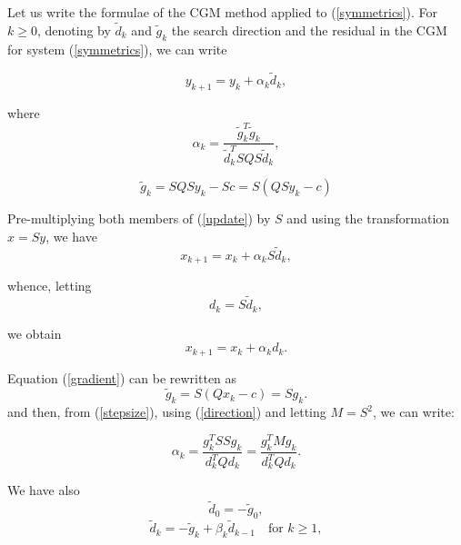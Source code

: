 \documentclass{ExerciseSheet}
\newif\ifsolutions
\begin{document}
\ifsolutions
\vskip 0.3cm
\begin{solution}
    Let us write the formulae of the CGM method applied to (\ref{symmetrics}). For $ k \geq 0 $, denoting by $\tilde{d}_k $ and $ \tilde{g}_k $ the search direction and the residual in the CGM for system (\ref{symmetrics}), we can write

\begin{equation} \label{update}
    y_{k+1} = y_k + \alpha_k \tilde{d}_k,
\end{equation}

where
\begin{equation}\label{stepsize}
    \alpha_k = \frac{\tilde{g}_k^T \tilde{g}_k}{\tilde{d}_k^T S Q S \tilde{d}_k},
\end{equation}

\begin{equation} \label{gradient}
    \tilde{g}_k = S Q S y_k - S c = S(Q S y_k - c) 
\end{equation}

Pre-multiplying both members of (\ref{update}) by $S$ and using the transformation $ x = S y $, we have
\begin{equation}
    x_{k+1} = x_k + \alpha_k S \tilde{d}_k,
\end{equation}

whence, letting
\begin{equation} \label{direction}
    d_k = S \tilde{d}_k, 
\end{equation}

we obtain
\begin{equation}
    x_{k+1} = x_k + \alpha_k d_k.
\end{equation}

Equation (\ref{gradient}) can be rewritten as
\begin{equation}
    \tilde{g}_k = S(Q x_k - c) = S g_k. 
\end{equation}
and then, from (\ref{stepsize}), using (\ref{direction}) and letting $ M = S^2 $, we can write:

\begin{equation} \label{newstepsize}
    \alpha_k = \frac{g_k^T SS g_k}{d_k^T Q d_k} = \frac{g_k^T M g_k}{d_k^T Q d_k}. 
\end{equation}

We have also
\begin{equation} \label{d_0}
    \tilde{d}_0 = -\tilde{g}_0, 
\end{equation}
\begin{equation} \label{tilde_d_k}
    \tilde{d}_k = -\tilde{g}_k + \beta_k \tilde{d}_{k-1} \quad \text{for } k \geq 1,
\end{equation}


\end{solution}
\end{document}
